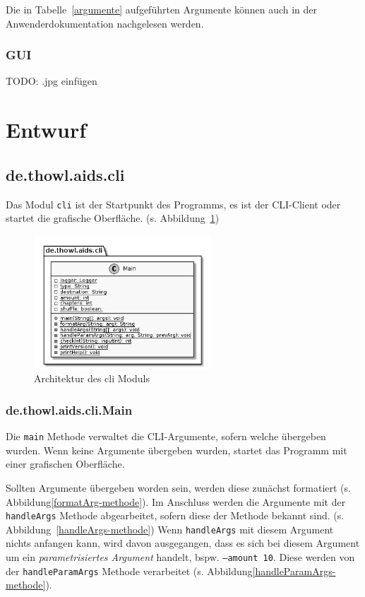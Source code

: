 \documentclass[stu, a4paper, 11pt, floatsintext]{apa7}
\begin{document}
\noindent Die in Tabelle~\ref{argumente} aufgeführten Argumente können auch in der Anwenderdokumentation nachgelesen werden.

\subsubsection{GUI}

TODO: .jpg einfügen

\clearpage

\section{Entwurf}

\subsection{de.thowl.aids.cli}

\noindent Das Modul \texttt{cli} ist der Startpunkt des Programms, es ist der CLI-Client oder startet die grafische Oberfläche. (s. Abbildung~\ref{CLI Architektur})

\begin{figure}[!htbp]
\centering
\includegraphics[width=250px]{../technical_documentation/diagramm/uml/flowcharts/cli/cli.png}
\caption{\label{CLI Architektur}Architektur des cli Moduls}
\end{figure}

\subsubsection{de.thowl.aids.cli.Main}
\noindent Die \texttt{main} Methode verwaltet die CLI-Argumente, sofern welche übergeben wurden.
Wenn keine Argumente übergeben wurden, startet das Programm mit einer grafischen Oberfläche.

Sollten Argumente übergeben worden sein, werden diese zunächst formatiert (s.
Abbildung\ref{formatArg-methode}). Im Anschluss werden die Argumente mit der  \texttt{handleArgs} Methode
abgearbeitet, sofern diese der Methode bekannt sind. (s.  Abbildung~\ref{handleArgs-methode})
Wenn \texttt{handleArgs} mit diesem Argument nichts anfangen kann, wird davon
ausgegangen, dass es sich bei diesem Argument um ein \emph{parametrisiertes Argument} handelt,
bspw. \texttt{–amount 10}. Diese werden von der \texttt{handleParamArgs} Methode verarbeitet (s.
Abbildung\ref{handleParamArgs-methode}).
\end{document}
